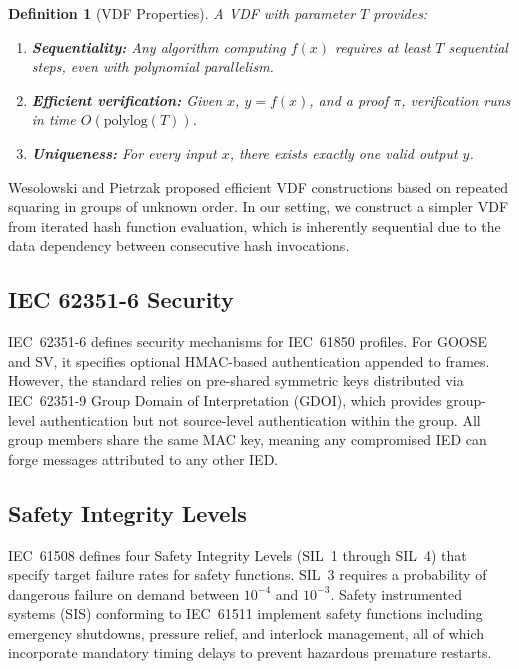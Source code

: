 \documentclass[conference,10pt]{IEEEtran}
\newtheorem{definition}[theorem]{Definition}
\newcommand{\GOOSE}{\textsf{GOOSE}}
\newcommand{\SV}{\textsf{SV}}
\begin{document}
\begin{definition}[VDF Properties]
A VDF with parameter $T$ provides:
\begin{enumerate}
  \item \textbf{Sequentiality:} Any algorithm computing $f(x)$ requires at least $T$ sequential steps, even with polynomial parallelism.
  \item \textbf{Efficient verification:} Given $x$, $y = f(x)$, and a proof $\pi$, verification runs in time $O(\text{polylog}(T))$.
  \item \textbf{Uniqueness:} For every input $x$, there exists exactly one valid output $y$.
\end{enumerate}
\end{definition}

Wesolowski \cite{wesolowski2019vdf} and Pietrzak \cite{pietrzak2019simple} proposed efficient VDF constructions based on repeated squaring in groups of unknown order. In our setting, we construct a simpler VDF from iterated hash function evaluation, which is inherently sequential due to the data dependency between consecutive hash invocations.

\subsection{IEC 62351-6 Security}

IEC~62351-6 \cite{iec62351-6} defines security mechanisms for IEC~61850 profiles. For \GOOSE{} and \SV{}, it specifies optional HMAC-based authentication appended to frames. However, the standard relies on pre-shared symmetric keys distributed via IEC~62351-9 Group Domain of Interpretation (GDOI), which provides group-level authentication but not source-level authentication within the group. All group members share the same MAC key, meaning any compromised IED can forge messages attributed to any other IED.

\subsection{Safety Integrity Levels}

IEC~61508 \cite{iec61508} defines four Safety Integrity Levels (SIL~1 through SIL~4) that specify target failure rates for safety functions. SIL~3 requires a probability of dangerous failure on demand between $10^{-4}$ and $10^{-3}$. Safety instrumented systems (SIS) conforming to IEC~61511 \cite{iec61511} implement safety functions including emergency shutdowns, pressure relief, and interlock management, all of which incorporate mandatory timing delays to prevent hazardous premature restarts.
\end{document}
